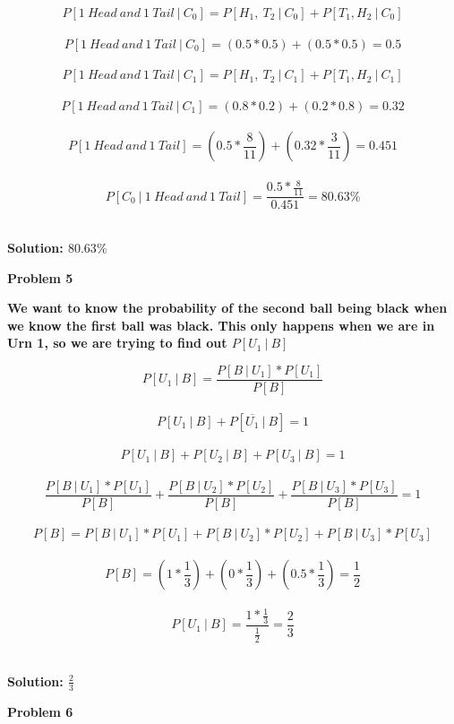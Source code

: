 \documentclass[11pt]{article}
\begin{document}
\begin{itemize}
$$P[1\ Head\ and\ 1\ Tail\ |\ C_0] = P[H_1,\ T_2\ |\ C_0] + P[T_1, H_2\ |\ C_0]$$
\\
$$P[1\ Head\ and\ 1\ Tail\ |\ C_0] = (0.5 * 0.5) + (0.5 * 0.5) = 0.5$$
\\
$$P[1\ Head\ and\ 1\ Tail\ |\ C_1] = P[H_1,\ T_2\ |\ C_1] + P[T_1, H_2\ |\ C_1]$$
\\
$$P[1\ Head\ and\ 1\ Tail\ |\ C_1] = (0.8 * 0.2) + (0.2 * 0.8) = 0.32$$
\\
$$P[1\ Head\ and\ 1\ Tail] = (0.5 * \frac{8}{11}) + (0.32 * \frac{3}{11}) = 0.451$$
\\
$$P[C_0\ |\ 1\ Head\ and\ 1\ Tail] = \frac{0.5 * \frac{8}{11}}{0.451} = 80.63\%$$
\\
\begin{center}
{\Large \textbf{Solution: $80.63\%$} }
\end{center}
\end{itemize}
\newpage
\textbf{Problem 5}
\\
\begin{center}
\textbf{We want to know the probability of the second ball being black when we know the first ball was black.  This only happens when we are in Urn 1, so we are trying to find out $P[U_1\ |\ B]$}
\end{center}
$$ P[U_1\ |\ B] = \frac{P[B\ |\ U_1] * P[U_1]}{P[B]}$$
\\
$$P[U_1\ |\ B] + P[\overline{U_1}\ |\ B] = 1$$
\\
$$P[U_1\ |\ B] + P[U_2\ |\ B] + P[U_3\ |\ B] = 1$$
\\
$$\frac{P[B\ |\ U_1] * P[U_1]}{P[B]} + \frac{P[B\ |\ U_2] * P[U_2]}{P[B]} + \frac{P[B\ |\ U_3] * P[U_3]}{P[B]} = 1$$
\\
$$P[B] = P[B\ |\ U_1] * P[U_1] + P[B\ |\ U_2] * P[U_2] + P[B\ |\ U_3] * P[U_3]$$
\\
$$P[B] = (1 * \frac{1}{3}) + (0 * \frac{1}{3}) + (0.5 * \frac{1}{3}) = \frac{1}{2}$$
\\
$$ P[U_1\ |\ B] = \frac{1 * \frac{1}{3}}{\frac{1}{2}} = \frac{2}{3}$$
\\
\begin{center}
{\huge \textbf{Solution: $\frac{2}{3}$} }
\end{center}
\newpage
\textbf{Problem 6}
\\
\end{document}
